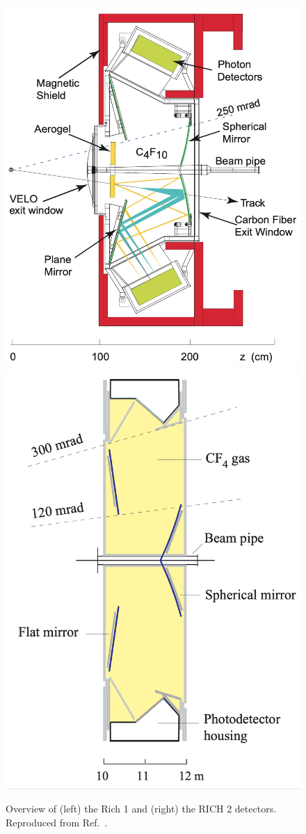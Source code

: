 \begin{figure}[tb]
    \centering
    \includegraphics[width=0.45\columnwidth]{figures/detector/RICH1.png}
    \includegraphics[width=0.4\columnwidth]{figures/detector/RICH2.png}
    \caption{Overview of (left) the Rich 1 and (right) the RICH 2 detectors. Reproduced from Ref.~\cite{LHCb-detector,RICH-TDR}.}
    \label{fig:RICHes}
\end{figure}

